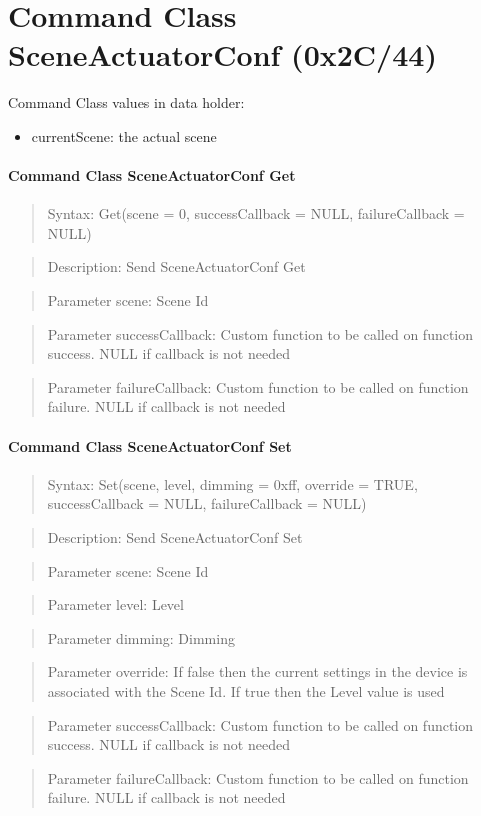 \section{Command Class SceneActuatorConf (0x2C/44)}

Command Class values in data holder:

\begin{itemize}
\item currentScene: the actual scene
\end{itemize}

\paragraph {Command Class SceneActuatorConf Get}
\begin{quote} Syntax: Get(scene = 0, successCallback = NULL, failureCallback = NULL)\end{quote}
\begin{quote} Description: Send SceneActuatorConf Get\end{quote}
\begin{quote} Parameter scene: Scene Id\end{quote}
\begin{quote} Parameter successCallback: Custom function to be called on function success. NULL if callback is not needed\end{quote}
\begin{quote} Parameter failureCallback: Custom function to be called on function failure. NULL if callback is not needed\end{quote}

\paragraph {Command Class SceneActuatorConf Set}
\begin{quote} Syntax: Set(scene, level, dimming = 0xff, override = TRUE, successCallback = NULL, failureCallback = NULL)\end{quote}
\begin{quote} Description: Send SceneActuatorConf Set\end{quote}
\begin{quote} Parameter scene: Scene Id\end{quote}
\begin{quote} Parameter level: Level\end{quote}
\begin{quote} Parameter dimming: Dimming\end{quote}
\begin{quote} Parameter override: If false then the current settings in the device is associated with the Scene Id. If true then the Level value is used\end{quote}
\begin{quote} Parameter successCallback: Custom function to be called on function success. NULL if callback is not needed\end{quote}
\begin{quote} Parameter failureCallback: Custom function to be called on function failure. NULL if callback is not needed\end{quote}


